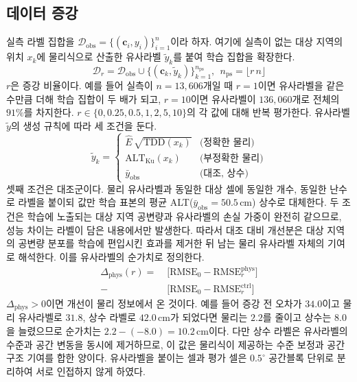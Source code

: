 \documentclass[10pt,twocolumn]{article}
\begin{document}
\subsection{데이터 증강}
실측 라벨 집합을 $\mathcal D_{\mathrm{obs}}=\{(\mathbf c_i,y_i)\}_{i=1}^{n}$이라 하자. 여기에 실측이 없는 대상 지역의 위치 $x_k$에 물리식으로 산출한 유사라벨 $\tilde y_k$를 붙여 학습 집합을 확장한다.
\begin{equation}
\mathcal D_r=\mathcal D_{\mathrm{obs}}\cup\big\{(\mathbf c_k,\tilde y_k)\big\}_{k=1}^{n_{\mathrm{ps}}},
\ \ n_{\mathrm{ps}}=\lfloor r\,n\rfloor
\label{eq:aug}
\end{equation}
$r$은 증강 비율이다. 예를 들어 실측이 $n=13{,}606$개일 때 $r=1$이면 유사라벨을 같은 수만큼 더해 학습 집합이 두 배가 되고, $r=10$이면 유사라벨이 $136{,}060$개로 전체의 $91\%$를 차지한다. $r\in\{0,0.25,0.5,1,2,5,10\}$의 각 값에 대해 반복 평가한다. 유사라벨 $\tilde y$의 생성 규칙에 따라 세 조건을 둔다.
\begin{equation}
\tilde y_k=
\begin{cases}
\hat E\,\sqrt{\mathrm{TDD}(x_k)} & \text{(정확한 물리)}\\[2pt]
\mathrm{ALT}_{\mathrm{Ku}}(x_k) & \text{(부정확한 물리)}\\[2pt]
\bar y_{\mathrm{obs}} & \text{(대조, 상수)}
\end{cases}
\label{eq:pseudo}
\end{equation}
셋째 조건은 대조군이다. 물리 유사라벨과 동일한 대상 셀에 동일한 개수, 동일한 난수로 라벨을 붙이되 값만 학습 표본의 평균 ALT($\bar y_{\mathrm{obs}}=50.5\,\mathrm{cm}$) 상수로 대체한다. 두 조건은 학습에 노출되는 대상 지역 공변량과 유사라벨의 손실 가중이 완전히 같으므로, 성능 차이는 라벨이 담은 내용에서만 발생한다. 따라서 대조 대비 개선분은 대상 지역의 공변량 분포를 학습에 편입시킨 효과를 제거한 뒤 남는 물리 유사라벨 자체의 기여로 해석한다. 이를 유사라벨의 순가치로 정의한다.
\begin{equation}
\begin{aligned}
\Delta_{\mathrm{phys}}(r)=\;&\big[\mathrm{RMSE}_{0}-\mathrm{RMSE}^{\mathrm{phys}}_{r}\big]\\
-\;&\big[\mathrm{RMSE}_{0}-\mathrm{RMSE}^{\mathrm{ctrl}}_{r}\big]
\end{aligned}
\label{eq:netvalue}
\end{equation}
$\Delta_{\mathrm{phys}}>0$이면 개선이 물리 정보에서 온 것이다. 예를 들어 증강 전 오차가 $34.0$이고 물리 유사라벨로 $31.8$, 상수 라벨로 $42.0\,\mathrm{cm}$가 되었다면 물리는 $2.2$를 줄이고 상수는 $8.0$을 늘렸으므로 순가치는 $2.2-(-8.0)=10.2\,\mathrm{cm}$이다. 다만 상수 라벨은 유사라벨의 수준과 공간 변동을 동시에 제거하므로, 이 값은 물리식이 제공하는 수준 보정과 공간 구조 기여를 합한 양이다. 유사라벨을 붙이는 셀과 평가 셀은 $0.5^\circ$ 공간블록 단위로 분리하여 서로 인접하지 않게 하였다.
\end{document}
